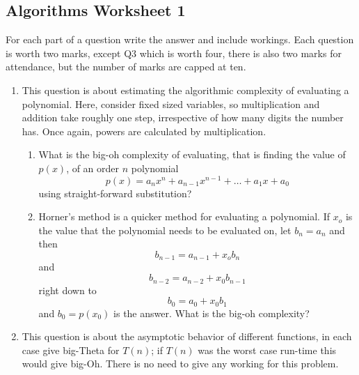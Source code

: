 \documentclass[11pt,a4paper]{scrartcl}
\newif\ifanswers
\begin{document}
\subsection*{Algorithms Worksheet 1}

For each part of a question write the answer and include
workings. Each question is worth two marks, except Q3 which is worth
four, there is also two marks for attendance, but the number of marks
are capped at ten.

\begin{enumerate}

\item This question is about estimating the algorithmic complexity of
  evaluating a polynomial. Here, consider fixed
  sized variables, so multiplication and addition take roughly one
  step, irrespective of how many digits the number has. Once again,
  powers are calculated by multiplication.

\begin{enumerate}
\item What is the big-oh complexity of evaluating, that is finding the
  value of $p(x)$, of an order $n$ polynomial
$$p(x)=a_n x^n +a_{n-1}x^{n-1}+\ldots+a_1x+a_0$$
using straight-forward substitution?
\item Horner's method is a quicker method for evaluating a
  polynomial. If $x_o$ is the value that the polynomial needs to be
  evaluated on, let $b_n=a_n$ and then 
$$ b_{n-1}=a_{n-1}+x_o b_{n}$$
and
$$ b_{n-2}=a_{n-2}+x_0 b_{n-1}$$
right down to 
$$ b_0=a_0+x_0b_1$$ and $b_0=p(x_0)$ is the answer. What is the big-oh
complexity?
\end{enumerate}


\ifanswers 

\noindent Solution: So calculating $x^i$ is $i-1$ multiplications, there are
faster ways to work out powers, but you are told that they are
calculated by multiplication; multiplying by $a_i$ is one more, so
that is $i$ calculations, thus evaluating the polynomial is
$1+2+3+\ldots n$ multiplications, along with $n-1$ additions; thus
this is $\Theta(n^2)$. However, using Horner's method each $b_i$ is a few calculations and there are $n$ $b_i$s, so that means it is $\Theta(n)$.

\fi

\item This question is about the asymptotic behavior of
  different functions, in each case give big-Theta for $T(n)$; if
  $T(n)$ was the worst case run-time this would give big-Oh. There is
  no need to give any working for this problem. 


\end{enumerate}
\end{document}
